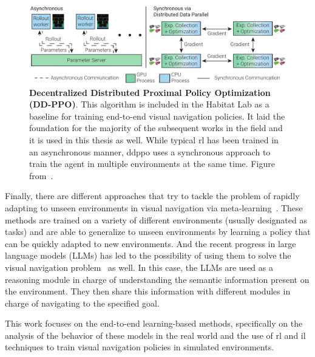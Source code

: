 \begin{figure}
    \centering
    \includegraphics[width=\textwidth]{figures/related_work/ddppo}
    \caption{\textbf{Decentralized Distributed Proximal Policy Optimization (DD-PPO)}.
    This algorithm is included in the Habitat Lab as a baseline for training end-to-end visual navigation policies.
    It laid the foundation for the majority of the subsequent works in the field and it is used in this thesis as well.
    While typical \acrshort{rl} has been trained in an asynchronous manner, \acrshort{ddppo} uses a synchronous approach to train the agent in multiple environments at the same time.
    Figure from~\cite{wijmans2020}.}
    \label{fig:ddppo}
\end{figure}

Finally, there are different approaches that try to tackle the problem of rapidly adapting to unseen environments in visual navigation via meta-learning~\cite{wortsman2019, luo2021, zhang2022}.
These methods are trained on a variety of different environments (usually designated as tasks) and are able to generalize to unseen environments by learning a policy that can be quickly adapted to new environments.
And the recent progress in large language models (LLMs) has led to the possibility of using them to solve the visual navigation problem~\cite{Huang2023, Zhou2023} as well.
In this case, the LLMs are used as a reasoning module in charge of understanding the semantic information present on the environment.
They then share this information with different modules in charge of navigating to the specified goal.

This work focuses on the end-to-end learning-based methods, specifically on the analysis of the behavior of these models in the real world and the use of \acrshort{rl} and \acrshort{il} techniques to train visual navigation policies in simulated environments.

